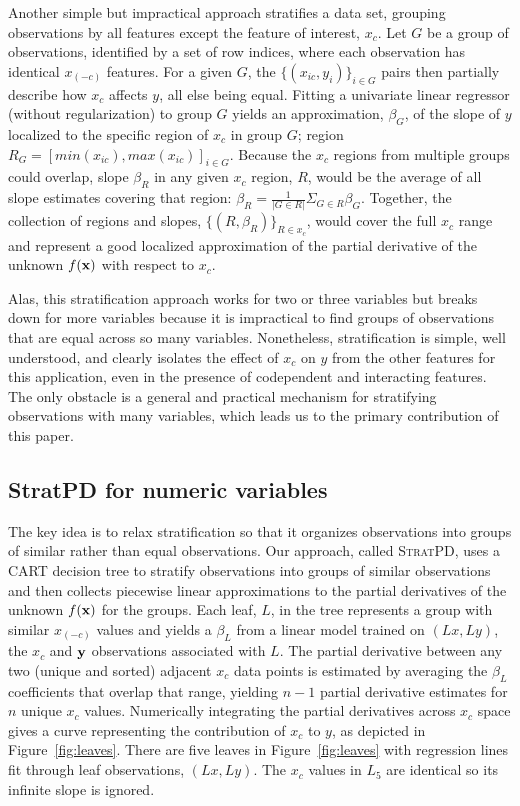 \documentclass[12pt]{article}
\newcommand{\figref}[1]{Figure~\ref{#1}}
\newcommand{\spd}{\fontfamily{cmr}\textsc{\small StratPD}}
\newcommand{\xnc}{$x_{(-c)}$}
\begin{document}
Another simple but impractical approach stratifies a data set, grouping observations by all features except the feature of interest, $x_c$.  Let $G$ be a group of observations, identified by a set of row indices, where each observation has identical \xnc{} features. For a given $G$, the $\{(x_{ic},  y_i)\}_{i \in G}$ pairs then partially describe how $x_c$ affects $y$, all else being equal.  Fitting a univariate linear regressor (without regularization) to group $G$ yields an approximation, $\beta_G$, of the slope of $y$ localized to the specific region of $x_c$ in group $G$; region $R_G = [min(x_{ic}), max(x_{ic})]_{i \in G}$.   Because the $x_c$ regions from multiple groups could overlap, slope $\beta_R$ in any given $x_c$ region, $R$, would be the average of all slope estimates covering that region: $\beta_R = \frac{1}{|G \in R|}\Sigma_{G \in R}\beta_G$. Together, the collection of regions and slopes, $\{(R, \beta_R)\}_{R \in x_c}$, would cover the full $x_c$ range and represent a good localized approximation of the partial derivative of the unknown $f(\bf x)$ with respect to $x_c$.

Alas, this stratification approach works for two or three variables but breaks down for more variables because it is impractical to find groups of observations that are equal across so many variables.  Nonetheless, stratification is simple, well understood, and clearly isolates the effect of $x_c$ on $y$ from the other features for this application, even in the presence of codependent and interacting features.  The only obstacle is a general and practical mechanism for stratifying observations with many variables, which leads us to the primary contribution of this paper.

\subsection{StratPD for numeric variables}

The key idea is to relax stratification so that it organizes observations into groups of similar rather than equal observations.  Our approach, called \spd, uses a CART decision tree \cite{CART} to stratify observations into  groups of similar observations and then collects piecewise linear approximations to the partial derivatives of the unknown $f(\bf x)$ for the groups. Each leaf, $L$, in the tree represents a group with similar \xnc{} values and yields a $\beta_L$ from a linear model trained on $(Lx, Ly)$, the $x_c$ and $\bf y$ observations associated with $L$.  The partial derivative between any two (unique and sorted) adjacent $x_c$ data points is estimated by averaging the $\beta_L$ coefficients that overlap that range, yielding $n-1$ partial derivative estimates for $n$ unique $x_c$ values.  Numerically integrating the partial derivatives across $x_c$ space gives a curve representing the contribution of $x_c$ to $y$, as depicted in \figref{fig:leaves}. There are five leaves in \figref{fig:leaves} with regression lines fit through leaf observations, $(Lx, Ly)$. The $x_c$ values in $L_5$ are identical so its infinite slope is ignored.
\end{document}
